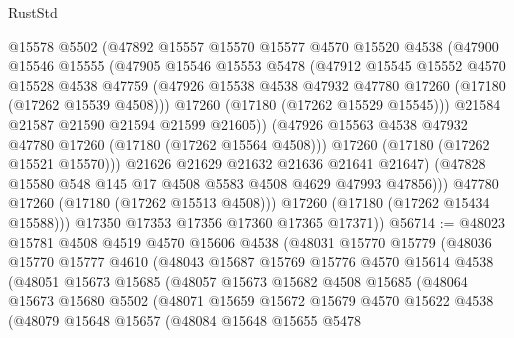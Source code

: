 \begin{lexlean}{RustStd}
\begin{coremodule}
                  @15578
                  @5502
                  (@47892
                    @15557
                    @15570
                    @15577
                    @4570
                    @15520
                    @4538
                    (@47900
                      @15546
                      @15555
                      (@47905
                        @15546
                        @15553
                        @5478
                        (@47912
                          @15545
                          @15552
                          @4570
                          @15528
                          @4538
                          @47759
                          (@47926 @15538 @4538 @47932 @47780 @17260 (@17180 (@17262 @15539 @4508)))
                          @17260
                          (@17180 (@17262 @15529 @15545)))
                        @21584
                        @21587
                        @21590
                        @21594
                        @21599
                        @21605))
                    (@47926 @15563 @4538 @47932 @47780 @17260 (@17180 (@17262 @15564 @4508)))
                    @17260
                    (@17180 (@17262 @15521 @15570)))
                  @21626
                  @21629
                  @21632
                  @21636
                  @21641
                  @21647)
                (@47828 @15580 @548 @145 @17 @4508 @5583 @4508 @4629 @47993 @47856)))
            @47780
            @17260
            (@17180 (@17262 @15513 @4508)))
          @17260
          (@17180 (@17262 @15434 @15588)))
        @17350
        @17353
        @17356
        @17360
        @17365
        @17371))
@56714 := @48023
    @15781
    @4508
    @4519
    @4570
    @15606
    @4538
    (@48031
      @15770
      @15779
      (@48036
        @15770
        @15777
        @4610
        (@48043
          @15687
          @15769
          @15776
          @4570
          @15614
          @4538
          (@48051
            @15673
            @15685
            (@48057
              @15673
              @15682
              @4508
              @15685
              (@48064
                @15673
                @15680
                @5502
                (@48071
                  @15659
                  @15672
                  @15679
                  @4570
                  @15622
                  @4538
                  (@48079
                    @15648
                    @15657
                    (@48084
                      @15648
                      @15655
                      @5478

\end{coremodule}
\end{lexlean}
